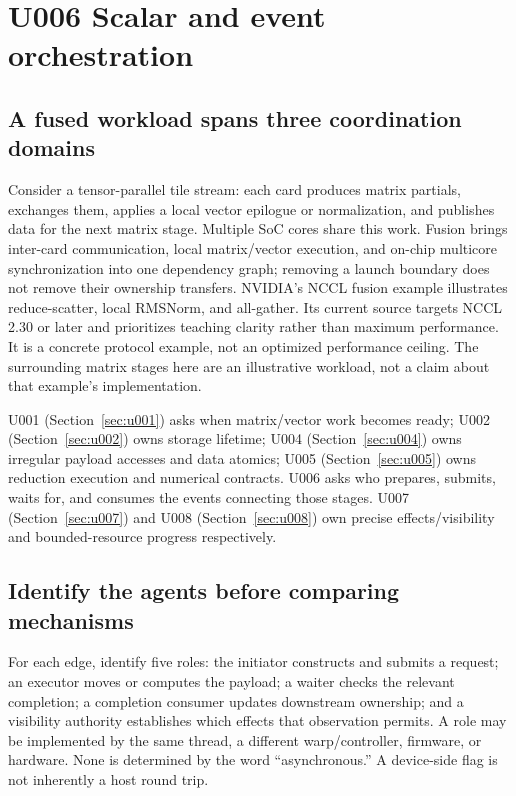 \section{U006 Scalar and event orchestration}
\label{sec:u006}

\subsection{A fused workload spans three coordination domains}

Consider a tensor-parallel tile stream: each card produces matrix partials, exchanges them, applies a local vector epilogue or normalization, and publishes data for the next matrix stage. Multiple SoC cores share this work. Fusion brings inter-card communication, local matrix/vector execution, and on-chip multicore synchronization into one dependency graph; removing a launch boundary does not remove their ownership transfers. NVIDIA's NCCL fusion example illustrates reduce-scatter, local RMSNorm, and all-gather. Its current source targets NCCL 2.30 or later and prioritizes teaching clarity rather than maximum performance. It is a concrete protocol example, not an optimized performance ceiling. The surrounding matrix stages here are an illustrative workload, not a claim about that example's implementation.\citep{u006-nccl-fusion}

U001 (Section~\ref{sec:u001}) asks when matrix/vector work becomes ready; U002 (Section~\ref{sec:u002}) owns storage lifetime; U004 (Section~\ref{sec:u004}) owns irregular payload accesses and data atomics; U005 (Section~\ref{sec:u005}) owns reduction execution and numerical contracts. U006 asks who prepares, submits, waits for, and consumes the events connecting those stages. U007 (Section~\ref{sec:u007}) and U008 (Section~\ref{sec:u008}) own precise effects/visibility and bounded-resource progress respectively.

\subsection{Identify the agents before comparing mechanisms}

For each edge, identify five roles: the initiator constructs and submits a request; an executor moves or computes the payload; a waiter checks the relevant completion; a completion consumer updates downstream ownership; and a visibility authority establishes which effects that observation permits. A role may be implemented by the same thread, a different warp/controller, firmware, or hardware. None is determined by the word ``asynchronous.'' A device-side flag is not inherently a host round trip.

